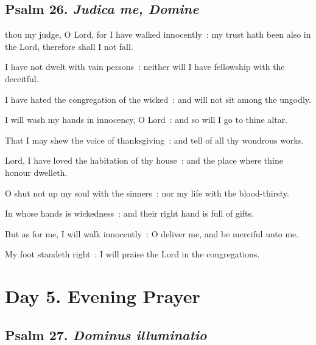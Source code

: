 \subsection{Psalm 26. \textit{Judica me, Domine}}

 thou my judge, O Lord, for I have walked innocently~: my trust hath been also in the Lord, therefore shall I not fall.\par
{}
I have not dwelt with vain persons~: neither will I have fellowship with the deceitful.\par
{}I have hated the congregation of the wicked~: and will not sit among the ungodly.\par
{}I will wash my hands in innocency, O Lord~: and so will I go to thine altar.\par
{}That I may shew the voice of thanksgiving~: and tell of all thy wondrous works.\par
{}Lord, I have loved the habitation of thy house~: and the place where thine honour dwelleth.\par
{}O shut not up my soul with the sinners~: nor my life with the blood-thirsty.\par
{}In whose hands is wickedness~: and their right hand is full of gifts.\par
{}But as for me, I will walk innocently~: O deliver me, and be merciful unto me.\par
{}My foot standeth right~: I will praise the Lord in the congregations.\par

\section*{Day 5. Evening Prayer}

\subsection{Psalm 27. \textit{Dominus illuminatio}}

